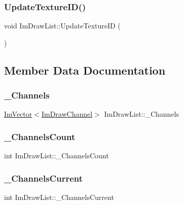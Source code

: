 \subsubsection{\texorpdfstring{Update\+Texture\+I\+D()}{UpdateTextureID()}}
{\footnotesize\ttfamily void Im\+Draw\+List\+::\+Update\+Texture\+ID (\begin{DoxyParamCaption}{ }\end{DoxyParamCaption})}



\subsection{Member Data Documentation}
\hypertarget{struct_im_draw_list_ae6be941728e5b2c81a03c78e4aa22629}{}\label{struct_im_draw_list_ae6be941728e5b2c81a03c78e4aa22629} 
\subsubsection{\texorpdfstring{\+\_\+\+Channels}{\_Channels}}
{\footnotesize\ttfamily \hyperlink{class_im_vector}{Im\+Vector}$<$\hyperlink{struct_im_draw_channel}{Im\+Draw\+Channel}$>$ Im\+Draw\+List\+::\+\_\+\+Channels}

\hypertarget{struct_im_draw_list_ae3854c12dbac41400f4acb65192f5015}{}\label{struct_im_draw_list_ae3854c12dbac41400f4acb65192f5015} 
\subsubsection{\texorpdfstring{\+\_\+\+Channels\+Count}{\_ChannelsCount}}
{\footnotesize\ttfamily int Im\+Draw\+List\+::\+\_\+\+Channels\+Count}

\hypertarget{struct_im_draw_list_a143ff30108f3dca8c28c7925e23d358b}{}\label{struct_im_draw_list_a143ff30108f3dca8c28c7925e23d358b} 
\subsubsection{\texorpdfstring{\+\_\+\+Channels\+Current}{\_ChannelsCurrent}}
{\footnotesize\ttfamily int Im\+Draw\+List\+::\+\_\+\+Channels\+Current}


